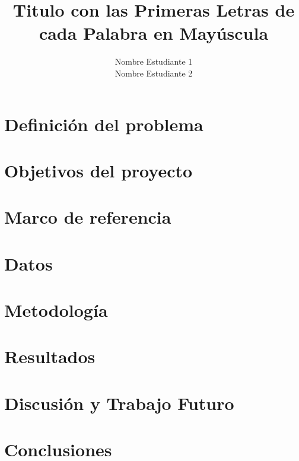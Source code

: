 \documentclass{unipd-thesis-modern} %
\title{Titulo con las Primeras Letras de cada Palabra en Mayúscula}
\author{Nombre Estudiante 1 \\Nombre Estudiante 2
}
\begin{document}
\renewcommand{\tablename}{Tabla}
\renewcommand{\listfigurename}{Lista de figuras}
\renewcommand{\listtablename}{Lista de tablas}
    \frontmatter
    
    \newpage
    \mainmatter

    \chapter{Definición del problema}
    
    \newpage
    

    \chapter{Objetivos del proyecto} %
    
    
    
    \chapter{Marco de referencia}
    
    

    \chapter{Datos}
        
     
    \chapter{Metodología}
        

     \chapter{Resultados}
     

    \chapter{Discusión y Trabajo Futuro}
    

    \chapter{Conclusiones}
    
   
\end{document}
